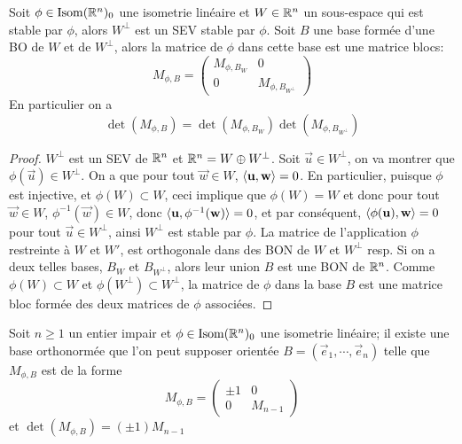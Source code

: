 \begin{theorem}
	Soit $\phi \in \operatorname{Isom}(\mathbb{R}^n)_0$ une isometrie linéaire et $W \in \mathbb{R}^n$ un
	sous-espace qui est stable par $\phi$, alors $W^\perp$ est un SEV stable par
	$\phi$. Soit $B$ une base formée d'une BO de $W$ et de $W^\perp$, alors la
	matrice de $\phi$ dans cette base est une matrice blocs:
	\begin{equation*}
		M_{\phi, B} = 
		\begin{pmatrix}
			M_{\phi, B_W} & 0 \\
			0 & M_{\phi, B_{W^\perp}}
			
		\end{pmatrix}
	\end{equation*}
	En particulier on a
	\begin{equation*}
		\det(M_{\phi, B}) = \det(M_{\phi, B_W})\det(M_{\phi, B_{W^\perp}})
	\end{equation*}
\end{theorem}

\begin{proof}
	$W^\perp$ est un SEV de $\mathbb{R}^n$ et $\mathbb{R}^n = W\oplus W^\perp$. Soit $\vec{u} \in
	W^\perp$, on va montrer que $\phi(\vec{u}) \in W^\perp$.
	On a que pour tout $\vec{w} \in W$, $\langle \mathbf{u}, \mathbf{w} \rangle = 0$. En
	particulier, puisque $\phi$ est injective, et $\phi(W) \subset W$, ceci
	implique que $\phi(W) = W$ et donc pour tout $\vec{w} \in W$, 
	$\phi^{-1}(\vec{w}) \in W$, donc $\langle \mathbf{u}, \phi^{-1}(\mathbf{w}) \rangle = 0$,
	et par conséquent, $\langle \phi(\mathbf{u}), \mathbf{w} \rangle = 0$ pour tout 
	$\vec{u} \in W^\perp$, ainsi $W^\perp$ est stable par $\phi$.
	La matrice de l'application $\phi$ restreinte à $W$ et $W'$, est orthogonale
	dans des BON de $W$ et $W^\perp$ resp. Si on a deux telles bases, $B_W$ et
	$B_{W^\perp}$, alors leur union $B$ est une BON de $\mathbb{R}^n$. Comme
	$\phi(W) \subset W$ et $\phi(W^\perp) \subset W^\perp$, la matrice de 
	$\phi$ dans la base $B$ est une matrice bloc formée des deux matrices de
	$\phi$ associées.
\end{proof}

\begin{theorem}
	Soit $n \geq 1$ un entier impair et $\phi \in \operatorname{Isom}(\mathbb{R}^n)_0$ une isometrie
	linéaire; il existe une base orthonormée que l'on peut supposer orientée
	$B = (\vec{e}_1, \cdots, \vec{e}_n)$ telle que $M_{\phi, B}$ est de la forme
	\begin{equation*}
		M_{\phi, B} =
		\begin{pmatrix}
			\pm 1 & 0 \\
			0 & M_{n-1}
		\end{pmatrix}
	\end{equation*}
	et $\det(M_{\phi, B}) = (\pm 1) M_{n-1}$
\end{theorem}

